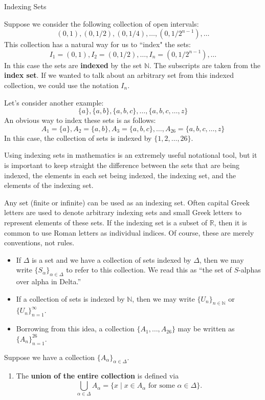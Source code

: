 \begin{section}{Indexing Sets}

Suppose we consider the following collection of open intervals:
\[
(0,1), (0,1/2), (0,1/4), \ldots, (0,1/2^{n-1}), \ldots
\]
This collection has a natural way for us to ``index" the sets:
\[
I_1=(0,1), I_2=(0,1/2), \ldots, I_n=(0,1/2^{n-1}), \ldots
\]
In this case the sets are \textbf{indexed} by the set $\mathbb{N}$.  The subscripts are taken from the \textbf{index set}.  If we wanted to talk about an arbitrary set from this indexed collection, we could use the notation $I_n$.

Let's consider another example:
\[
\{a\}, \{a,b\}, \{a,b,c\}, \ldots, \{a,b,c,\ldots,z\}
\]
An obvious way to index these sets is as follows:
\[
A_1=\{a\}, A_2=\{a,b\}, A_3=\{a,b,c\}, \ldots, A_{26}=\{a,b,c,\ldots,z\}
\]
In this case, the collection of sets is indexed by $\{1,2,\ldots, 26\}$.

Using indexing sets in mathematics is an extremely useful notational tool, but it is important to keep straight the difference between the sets that are being indexed, the elements in each set being indexed, the indexing set, and the elements of the indexing set.

Any set (finite or infinite) can be used as an indexing set. Often capital Greek letters are used to denote arbitrary indexing sets and small Greek letters to represent elements of these sets. If the indexing set is a subset of $\mathbb{R}$, then it is common to use Roman letters as individual indices. Of course, these are merely conventions, not rules.
\begin{itemize}\setlength{\itemsep}{0in}
\item If $\Delta$ is a set and we have a collection of sets indexed by $\Delta$, then we may write $\{S_{\alpha}\}_{\alpha\in \Delta}$ to refer to this collection. We read this as ``the set of $S$-alphas over alpha in Delta.''
\item If a collection of sets is indexed by $\mathbb{N}$, then we may write $\{U_n\}_{n\in\mathbb{N}}$ or $\{U_n\}_{n=1}^{\infty}$.
\item Borrowing from this idea, a collection $\{A_1,\ldots,A_{26}\}$ may be written as $\{A_n\}_{n=1}^{26}$.
\end{itemize}

\begin{definition}
Suppose we have a collection $\{A_{\alpha}\}_{\alpha\in\Delta}$.
\begin{enumerate}[label=\textrm{(\alph*)}]
\item The \textbf{union of the entire collection} is defined via
\[
\boxed{\bigcup_{\alpha\in\Delta} A_{\alpha}=\{x\mid x\in A_{\alpha} \mbox{ for some }\alpha\in \Delta\}.}
\]


\end{enumerate}
\end{definition}
\end{section}
